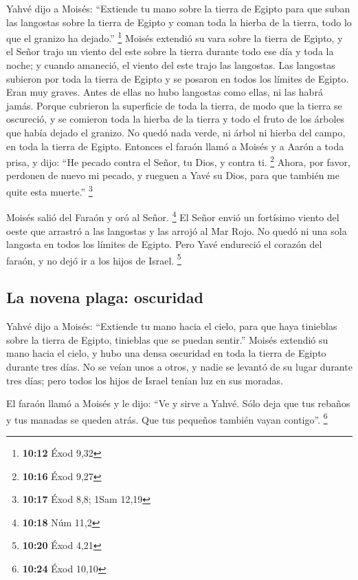  Yahvé dijo a Moisés: ``Extiende tu mano sobre la tierra
de Egipto para que suban las langostas sobre la tierra de Egipto y coman
toda la hierba de la tierra, todo lo que el granizo ha dejado.''
\footnote{\textbf{10:12} Éxod 9,32}  Moisés extendió su
vara sobre la tierra de Egipto, y el Señor trajo un viento del este
sobre la tierra durante todo ese día y toda la noche; y cuando amaneció,
el viento del este trajo las langostas.  Las langostas
subieron por toda la tierra de Egipto y se posaron en todos los límites
de Egipto. Eran muy graves. Antes de ellas no hubo langostas como ellas,
ni las habrá jamás.  Porque cubrieron la superficie de
toda la tierra, de modo que la tierra se oscureció, y se comieron toda
la hierba de la tierra y todo el fruto de los árboles que había dejado
el granizo. No quedó nada verde, ni árbol ni hierba del campo, en toda
la tierra de Egipto.  Entonces el faraón llamó a Moisés y
a Aarón a toda prisa, y dijo: ``He pecado contra el Señor, tu Dios, y
contra ti. \footnote{\textbf{10:16} Éxod 9,27}  Ahora,
por favor, perdonen de nuevo mi pecado, y rueguen a Yavé su Dios, para
que también me quite esta muerte.'' \footnote{\textbf{10:17} Éxod 8,8;
  1Sam 12,19}

 Moisés salió del Faraón y oró al Señor. \footnote{\textbf{10:18}
  Núm 11,2}  El Señor envió un fortísimo viento del oeste
que arrastró a las langostas y las arrojó al Mar Rojo. No quedó ni una
sola langosta en todos los límites de Egipto.  Pero Yavé
endureció el corazón del faraón, y no dejó ir a los hijos de Israel.
\footnote{\textbf{10:20} Éxod 4,21}

\hypertarget{la-novena-plaga-oscuridad}{%
\subsection{La novena plaga:
oscuridad}\label{la-novena-plaga-oscuridad}}

 Yahvé dijo a Moisés: ``Extiende tu mano hacia el cielo,
para que haya tinieblas sobre la tierra de Egipto, tinieblas que se
puedan sentir.''  Moisés extendió su mano hacia el cielo,
y hubo una densa oscuridad en toda la tierra de Egipto durante tres
días.  No se veían unos a otros, y nadie se levantó de su
lugar durante tres días; pero todos los hijos de Israel tenían luz en
sus moradas.

 El faraón llamó a Moisés y le dijo: ``Ve y sirve a
Yahvé. Sólo deja que tus rebaños y tus manadas se queden atrás. Que tus
pequeños también vayan contigo''. \footnote{\textbf{10:24} Éxod 10,10}

